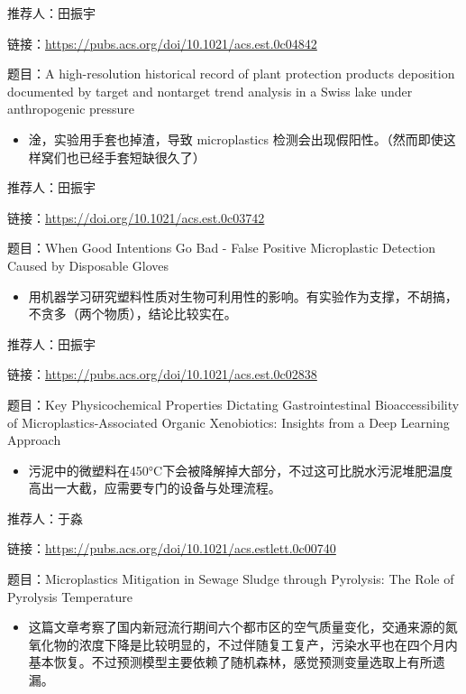 \documentclass[]{book}
\providecommand{\tightlist}{%
  \setlength{\itemsep}{0pt}\setlength{\parskip}{0pt}}
\begin{document}
推荐人：田振宇

链接：\url{https://pubs.acs.org/doi/10.1021/acs.est.0c04842}

题目：A high-resolution historical record of plant protection products deposition documented by target and nontarget trend analysis in a Swiss lake under anthropogenic pressure

\begin{itemize}
\tightlist
\item
  淦，实验用手套也掉渣，导致 microplastics 检测会出现假阳性。（然而即使这样窝们也已经手套短缺很久了）
\end{itemize}

推荐人：田振宇

链接：\url{https://doi.org/10.1021/acs.est.0c03742}

题目：When Good Intentions Go Bad - False Positive Microplastic Detection Caused by Disposable Gloves

\begin{itemize}
\tightlist
\item
  用机器学习研究塑料性质对生物可利用性的影响。有实验作为支撑，不胡搞，不贪多（两个物质），结论比较实在。
\end{itemize}

推荐人：田振宇

链接：\url{https://pubs.acs.org/doi/10.1021/acs.est.0c02838}

题目：Key Physicochemical Properties Dictating Gastrointestinal Bioaccessibility of Microplastics-Associated Organic Xenobiotics: Insights from a Deep Learning Approach

\begin{itemize}
\tightlist
\item
  污泥中的微塑料在450°C下会被降解掉大部分，不过这可比脱水污泥堆肥温度高出一大截，应需要专门的设备与处理流程。
\end{itemize}

推荐人：于淼

链接：\url{https://pubs.acs.org/doi/10.1021/acs.estlett.0c00740}

题目：Microplastics Mitigation in Sewage Sludge through Pyrolysis: The Role of Pyrolysis Temperature

\begin{itemize}
\tightlist
\item
  这篇文章考察了国内新冠流行期间六个都市区的空气质量变化，交通来源的氮氧化物的浓度下降是比较明显的，不过伴随复工复产，污染水平也在四个月内基本恢复。不过预测模型主要依赖了随机森林，感觉预测变量选取上有所遗漏。
\end{itemize}
\end{document}
